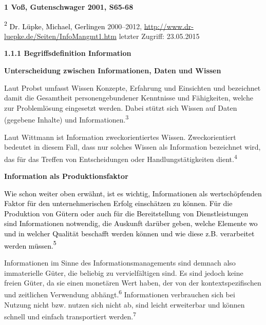 \documentclass[a4paper]{article}
\begin{document}
\bigskip


\bigskip


\bigskip

{\sffamily\bfseries\color{black}
\textmd{1 Voß, Gutenschwager 2001, S65-68}}

{\sffamily
\textcolor{black}{\textsuperscript{2 }}\textcolor{black}{Dr. Lüpke, Michael, Gerlingen} 2000–2012,
\url{http://www.dr-luepke.de/Seiten/InfoMangmt1.htm} letzter Zugriff: 23.05.2015}

{\sffamily\bfseries\color{black}
1.1.1 Begriffsdefinition Information}


\bigskip

{\sffamily\bfseries\color{black}
Unterscheidung zwischen Informationen, Daten und Wissen}

{\sffamily\color{black}
Laut Probst umfasst Wissen Konzepte, Erfahrung und Einsichten und bezeichnet damit die Gesamtheit personengebundener
Kenntnisse und Fähigkeiten, welche zur Problemlösung eingesetzt werden. Dabei stützt sich Wissen auf Daten (gegebene
Inhalte) und Informationen.\textsuperscript{3}}

{\sffamily\color{black}
Laut Wittmann ist Information zweckorientiertes Wissen. Zweckorientiert bedeutet in diesem Fall, dass nur solches Wissen
als Information bezeichnet wird, das für das Treffen von Entscheidungen oder Handlungstätigkeiten
dient.\textsuperscript{4}}


\bigskip

{\sffamily\bfseries\color{black}
Information als Produktionsfaktor}

{\sffamily
\textcolor{black}{Wie schon weiter oben erwähnt, ist es wichtig, Informationen als wertschöpfenden Faktor für den
unternehmerischen Erfolg einschätzen zu können. Für die Produktion von Gütern oder auch für die Bereitstellung von
Dienstleistungen sind Informationen notwendig, die Auskunft darüber geben, welche Elemente wo und in welcher Qualität
beschafft werden können und wie diese z.B. verarbeitet werden müssen.}\textcolor{black}{\textsuperscript{5}} \ }


\bigskip

{\sffamily\color{black}
Informationen im Sinne des Informationsmanagements sind demnach also immaterielle Güter, die beliebig zu vervielfältigen
sind. Es sind jedoch keine freien Güter, da sie einen monetären Wert haben, der von der kontextspezifischen und
zeitlichen Verwendung abhängt.\textsuperscript{6} Informationen verbrauchen sich bei Nutzung nicht bzw. nutzen sich
nicht ab, sind leicht erweiterbar und können schnell und einfach transportiert werden.\textsuperscript{7}}
\end{document}
